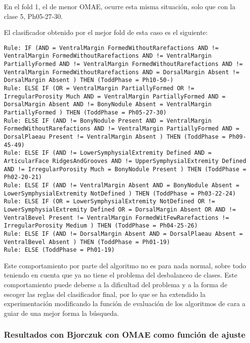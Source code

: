 En el fold 1, el de menor OMAE, ocurre esta misma situación, solo que con la clase 5, Ph05-27-30.


El clasificador obtenido por el mejor fold de esta caso es el siguiente:

\begin{lstlisting}
Rule: IF (AND = VentralMargin FormedWithoutRarefactions AND != VentralMargin FormedWithoutRarefactions AND != VentralMargin PartiallyFormed AND != VentralMargin FormedWithoutRarefactions AND != VentralMargin FormedWithoutRarefactions AND = DorsalMargin Absent != DorsalMargin Absent ) THEN (ToddPhase = Ph10-50-)
Rule: ELSE IF (OR = VentralMargin PartiallyFormed OR != IrregularPorosity Much AND = VentralMargin PartiallyFormed AND = DorsalMargin Absent AND != BonyNodule Absent = VentralMargin PartiallyFormed ) THEN (ToddPhase = Ph05-27-30)
Rule: ELSE IF (AND != BonyNodule Present AND = VentralMargin FormedWithoutRarefactions AND != VentralMargin PartiallyFormed AND = DorsalPlaeau Present != VentralMargin Absent ) THEN (ToddPhase = Ph09-45-49)
Rule: ELSE IF (AND != LowerSymphysialExtremity Defined AND = ArticularFace RidgesAndGrooves AND != UpperSymphysialExtremity Defined AND != IrregularPorosity Much = BonyNodule Present ) THEN (ToddPhase = Ph02-20-21)
Rule: ELSE IF (AND != VentralMargin Absent AND = BonyNodule Absent = LowerSymphysialExtremity NotDefined ) THEN (ToddPhase = Ph03-22-24)
Rule: ELSE IF (OR = LowerSymphysialExtremity NotDefined OR != LowerSymphysialExtremity Defined OR = DorsalMargin Absent OR AND != VentralBevel Present != VentralMargin FormedWitFewRarefactions != IrregularPorosity Medium ) THEN (ToddPhase = Ph04-25-26)
Rule: ELSE IF (AND != DorsalMargin Absent AND = DorsalPlaeau Absent = VentralBevel Absent ) THEN (ToddPhase = Ph01-19)
Rule: ELSE (ToddPhase = Ph01-19)
\end{lstlisting}



Este comportamiento por parte del algoritmo no es para nada normal, sobre todo teniendo en cuenta que ya no tiene el problema del desbalanceo de clases. Este comportamiento puede deberse a la dificultad del problema y a la forma de escoger las reglas del clasificador final, por lo que se ha extendido la experimentación modificando la función de evaluación de los algoritmos de cara a guiar de una mejor forma la búsqueda.

\subsubsection{Resultados con Bjorczuk con OMAE como función de ajuste}




